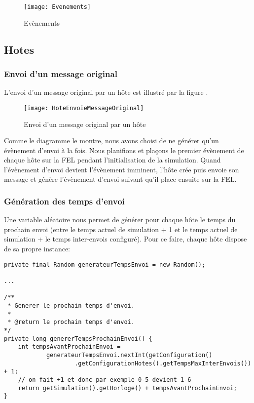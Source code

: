 \documentclass[a4paper,11pt]{article}
\begin{document}
\begin{figure}[h!t]
  \centering
    \texttt{[image: Evenements]}
  \caption{Evènements}
  \label{fig:evenements}
\end{figure}




\subsection{Hotes}


\subsubsection{Envoi d'un message original}
L'envoi d'un message original par un hôte est illustré par la figure . 

\begin{figure}[h!t]
  \centering
    \texttt{[image: HoteEnvoieMessageOriginal]}
  \caption{Envoi d'un message original par un hôte}
  \label{fig:hote-envoie-message-original}
\end{figure}

Comme le diagramme le montre, nous avons choisi de ne générer qu'un évènement d'envoi à la fois. Nous planifions et plaçons le premier évènement de chaque hôte sur la FEL pendant l'initialisation de la simulation. Quand l'évènement d'envoi devient l'évènement imminent, l'hôte crée puis envoie son message et génère l'évènement d'envoi suivant qu'il place ensuite sur la FEL.


\clearpage
\subsubsection*{Génération des temps d'envoi}
Une variable aléatoire nous permet de générer pour chaque hôte le temps du prochain envoi (entre le temps actuel de simulation + 1 et le temps actuel de simulation + le temps inter-envois configuré). Pour ce faire, chaque hôte dispose de sa propre instance:

\begin{lstlisting}[caption=Génération des temps d'envoi]
private final Random generateurTempsEnvoi = new Random();

...

/**
 * Generer le prochain temps d'envoi.
 *
 * @return le prochain temps d'envoi.
*/
private long genererTempsProchainEnvoi() {
	int tempsAvantProchainEnvoi =
			generateurTempsEnvoi.nextInt(getConfiguration()
					.getConfigurationHotes().getTempsMaxInterEnvois()) + 1;
	// on fait +1 et donc par exemple 0-5 devient 1-6
	return getSimulation().getHorloge() + tempsAvantProchainEnvoi;
}
\end{lstlisting}
\end{document}
